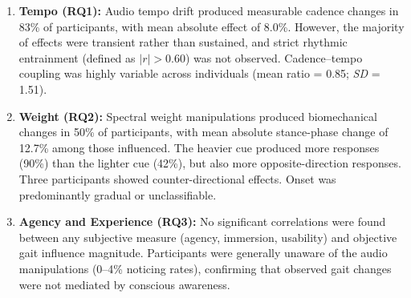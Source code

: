 \begin{enumerate}
    \item \textbf{Tempo (RQ1):} Audio tempo drift produced measurable cadence
          changes in 83\% of participants, with mean absolute effect of 8.0\%.
          However, the majority of effects were transient rather than sustained,
          and strict rhythmic entrainment (defined as $|r| > 0.60$) was not
          observed. Cadence--tempo coupling was highly variable across
          individuals (mean ratio = 0.85; \textit{SD} = 1.51).

    \item \textbf{Weight (RQ2):} Spectral weight manipulations produced
          biomechanical changes in 50\% of participants, with mean absolute
          stance-phase change of 12.7\% among those influenced. The heavier cue
          produced more responses (90\%) than the lighter cue (42\%), but also
          more opposite-direction responses. Three participants showed
          counter-directional effects. Onset was predominantly gradual or
          unclassifiable.

    \item \textbf{Agency and Experience (RQ3):} No significant correlations were
          found between any subjective measure (agency, immersion, usability)
          and objective gait influence magnitude. Participants were generally
          unaware of the audio manipulations (0--4\% noticing rates), confirming
          that observed gait changes were not mediated by conscious awareness.
\end{enumerate}
